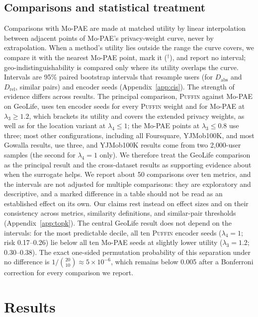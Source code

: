 \documentclass[sigconf,anonymous,review]{acmart}
\newcommand{\puffin}{\textsc{Puffin}}
\begin{document}
\subsection{Comparisons and statistical treatment}
\label{sec:stats}
Comparisons with Mo-PAE are made at matched utility by linear interpolation between adjacent points of Mo-PAE's privacy-weight curve, never by extrapolation. When a method's utility lies outside the range the curve covers, we compare it with the nearest Mo-PAE point, mark it ($^\dagger$), and report no interval; geo-indistinguishability is compared only where its utility overlaps the curve. Intervals are 95\% paired bootstrap intervals that resample users (for $D_{\mathrm{abs}}$ and $D_{\mathrm{rel}}$, similar pairs) and encoder seeds (Appendix~\ref{app:cis}). The strength of evidence differs across results. The principal comparison, \puffin{} against Mo-PAE on GeoLife, uses ten encoder seeds for every \puffin{} weight and for Mo-PAE at $\lambda_3\ge1.2$, which brackets its utility and covers the extended privacy weights, as well as for the location variant at $\lambda_4\le1$; the Mo-PAE points at $\lambda_3\le0.8$ use three; most other configurations, including all Foursquare, YJMob100K, and most Gowalla results, use three, and YJMob100K results come from two 2{,}000-user samples (the second for $\lambda_4=1$ only). We therefore treat the GeoLife comparison as the principal result and the cross-dataset results as supporting evidence about when the surrogate helps. We report about 50 comparisons over ten metrics, and the intervals are not adjusted for multiple comparisons: they are exploratory and descriptive, and a marked difference in a table should not be read as an established effect on its own. Our claims rest instead on effect sizes and on their consistency across metrics, similarity definitions, and similar-pair thresholds (Appendix~\ref{app:topk}). The central GeoLife result does not depend on the intervals: for the most predictable decile, all ten \puffin{} encoder seeds ($\lambda_4=1$; risk 0.17--0.26) lie below all ten Mo-PAE seeds at slightly lower utility ($\lambda_3=1.2$; 0.30--0.38). The exact one-sided permutation probability of this separation under no difference is $1/\binom{20}{10}\approx5\times10^{-6}$, which remains below 0.005 after a Bonferroni correction for every comparison we report.

\section{Results}
\label{sec:results}
\end{document}
